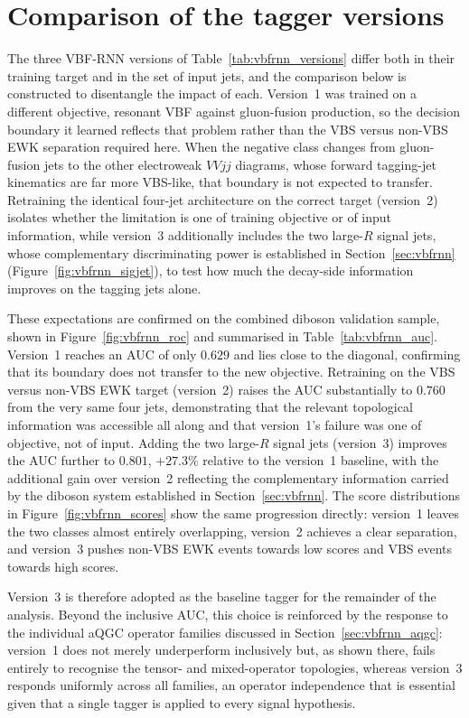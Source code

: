 \section{Comparison of the tagger versions}
\label{sec:vbfrnn_perf}

The three VBF-RNN versions of Table~\ref{tab:vbfrnn_versions} differ both in their training target and in the set of input jets, and the comparison below is constructed to disentangle the impact of each. Version~1 was trained on a different objective, resonant VBF against gluon-fusion production, so the decision boundary it learned reflects that problem rather than the VBS versus non-VBS EWK separation required here. When the negative class changes from gluon-fusion jets to the other electroweak $VVjj$ diagrams, whose forward tagging-jet kinematics are far more VBS-like, that boundary is not expected to transfer. Retraining the identical four-jet architecture on the correct target (version~2) isolates whether the limitation is one of training objective or of input information, while version~3 additionally includes the two large-$R$ signal jets, whose complementary discriminating power is established in Section~\ref{sec:vbfrnn} (Figure~\ref{fig:vbfrnn_sigjet}), to test how much the decay-side information improves on the tagging jets alone.

These expectations are confirmed on the combined diboson validation sample, shown in Figure~\ref{fig:vbfrnn_roc} and summarised in Table~\ref{tab:vbfrnn_auc}. Version~1 reaches an AUC of only $0.629$ and lies close to the diagonal, confirming that its boundary does not transfer to the new objective. Retraining on the VBS versus non-VBS EWK target (version~2) raises the AUC substantially to $0.760$ from the very same four jets, demonstrating that the relevant topological information was accessible all along and that version~1's failure was one of objective, not of input. Adding the two large-$R$ signal jets (version~3) improves the AUC further to $0.801$, $+27.3\%$ relative to the version~1 baseline, with the additional gain over version~2 reflecting the complementary information carried by the diboson system established in Section~\ref{sec:vbfrnn}. The score distributions in Figure~\ref{fig:vbfrnn_scores} show the same progression directly: version~1 leaves the two classes almost entirely overlapping, version~2 achieves a clear separation, and version~3 pushes non-VBS EWK events towards low scores and VBS events towards high scores.

Version~3 is therefore adopted as the baseline tagger for the remainder of the analysis. Beyond the inclusive AUC, this choice is reinforced by the response to the individual aQGC operator families discussed in Section~\ref{sec:vbfrnn_aqgc}: version~1 does not merely underperform inclusively but, as shown there, fails entirely to recognise the tensor- and mixed-operator topologies, whereas version~3 responds uniformly across all families, an operator independence that is essential given that a single tagger is applied to every signal hypothesis.

